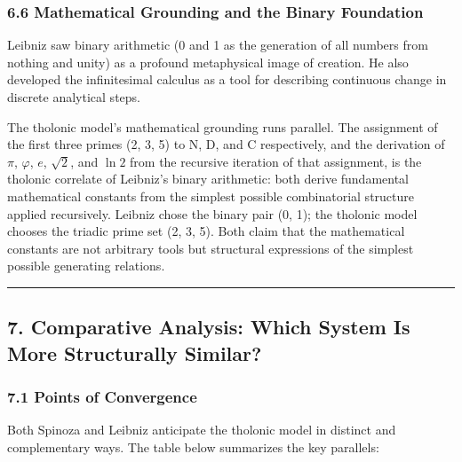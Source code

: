 \documentclass[
  11pt,
  letterpaper,
]{article}
\begin{document}
\subsubsection{6.6 Mathematical Grounding and the Binary
Foundation}\label{mathematical-grounding-and-the-binary-foundation}

Leibniz saw binary arithmetic (0 and 1 as the generation of all numbers
from nothing and unity) as a profound metaphysical image of creation. He
also developed the infinitesimal calculus as a tool for describing
continuous change in discrete analytical steps.

The tholonic model's mathematical grounding runs parallel. The
assignment of the first three primes (2, 3, 5) to N, D, and C
respectively, and the derivation of \(\pi\), \(\varphi\), \(e\),
\(\sqrt{2}\), and \(\ln 2\) from the recursive iteration of that
assignment, is the tholonic correlate of Leibniz's binary arithmetic:
both derive fundamental mathematical constants from the simplest
possible combinatorial structure applied recursively. Leibniz chose the
binary pair (0, 1); the tholonic model chooses the triadic prime set (2,
3, 5). Both claim that the mathematical constants are not arbitrary
tools but structural expressions of the simplest possible generating
relations.

\begin{center}\rule{0.5\linewidth}{0.5pt}\end{center}

\subsection{7. Comparative Analysis: Which System Is More Structurally
Similar?}\label{comparative-analysis-which-system-is-more-structurally-similar}

\subsubsection{7.1 Points of Convergence}\label{points-of-convergence}

Both Spinoza and Leibniz anticipate the tholonic model in distinct and
complementary ways. The table below summarizes the key parallels:
\end{document}
